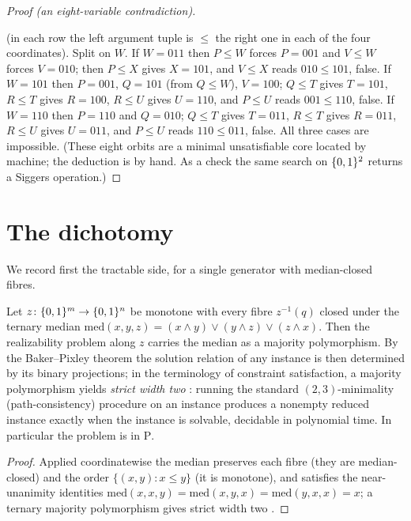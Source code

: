 \begin{proof}[Proof (an eight-variable contradiction)]
\begin{center}
  \end{center}
  (in each row the left argument tuple is $\le$ the right one in each of
  the four coordinates).  Split on $W$.  If $W=011$ then $P\le W$ forces $P=001$ and $V\le W$
  forces $V=010$; then $P\le X$ gives $X=101$, and $V\le X$ reads
  $010\le101$, false.  If $W=101$ then $P=001$, $Q=101$ (from $Q\le W$),
  $V=100$; $Q\le T$ gives $T=101$, $R\le T$ gives $R=100$, $R\le U$ gives
  $U=110$, and $P\le U$ reads $001\le110$, false.  If $W=110$ then
  $P=110$ and $Q=010$; $Q\le T$ gives $T=011$, $R\le T$ gives $R=011$,
  $R\le U$ gives $U=011$, and $P\le U$ reads $110\le011$, false.  All
  three cases are impossible.  (These eight orbits are a minimal
  unsatisfiable core located by machine; the deduction is by hand.  As a
  check the same search on $\{0,1\}^2$ returns a Siggers operation.)
\end{proof}

\section{The dichotomy}

We record first the tractable side, for a single generator with
median-closed fibres.

\begin{prop}\label{prop:sw2}
  Let $z\colon\{0,1\}^m\to\{0,1\}^n$ be monotone with every fibre $z^{-1}(q)$
  closed under the ternary median $\mathrm{med}(x,y,z)=(x\wedge y)\vee
  (y\wedge z)\vee(z\wedge x)$.  Then the realizability problem along $z$
  carries the median as a majority polymorphism.  By the Baker--Pixley
  theorem \cite{BakerPixley} the solution relation of any instance is then
  determined by its binary projections; in the terminology of constraint
  satisfaction, a majority polymorphism yields \emph{strict width two}
  \cite{BartoKozik}: running the standard $(2,3)$-minimality
  (path-consistency) procedure on an instance produces a nonempty reduced
  instance exactly when the instance is solvable, decidable in polynomial
  time.  In particular the problem is in $\mathrm P$.
\end{prop}
\begin{proof}
  Applied coordinatewise the median preserves each fibre (they are
  median-closed) and the order $\{(x,y):x\le y\}$ (it is monotone), and
  satisfies the near-unanimity identities $\mathrm{med}(x,x,y)=
  \mathrm{med}(x,y,x)=\mathrm{med}(y,x,x)=x$; a ternary majority
  polymorphism gives strict width two \cite{BakerPixley,BartoKozik}.
\end{proof}

